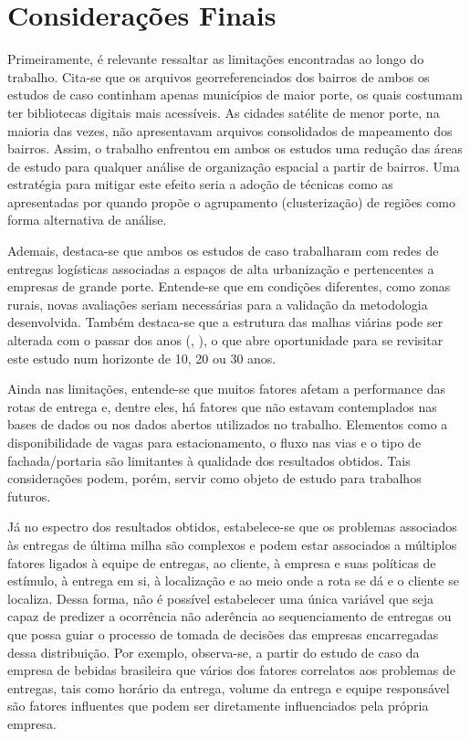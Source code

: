 \chapter{Considerações Finais} \label{sec:consideracoesFinais}

Primeiramente, é relevante ressaltar as limitações encontradas ao longo do trabalho.
Cita-se que os arquivos georreferenciados dos bairros de ambos os estudos de caso continham apenas municípios de maior porte, os quais costumam ter bibliotecas digitais mais acessíveis.
As cidades satélite de menor porte, na maioria das vezes, não apresentavam arquivos consolidados de mapeamento dos bairros.
Assim, o trabalho enfrentou em ambos os estudos uma redução das áreas de estudo para qualquer análise de organização espacial a partir de bairros.
Uma estratégia para mitigar este efeito seria a adoção de técnicas como as apresentadas por  quando propõe o agrupamento (clusterização) de regiões como forma alternativa de análise.

Ademais, destaca-se que ambos os estudos de caso trabalharam com redes de entregas logísticas associadas a espaços de alta urbanização e pertencentes a empresas de grande porte.
Entende-se que em condições diferentes, como zonas rurais, novas avaliações seriam necessárias para a validação da metodologia desenvolvida.
Também destaca-se que a estrutura das malhas viárias pode ser alterada com o passar dos anos (\citeauthoronline{}, \citeyear{}), o que abre oportunidade para se revisitar este estudo num horizonte de 10, 20 ou 30 anos. 

Ainda nas limitações, entende-se que muitos fatores afetam a performance das rotas de entrega e, dentre eles, há fatores que não estavam contemplados nas bases de dados ou nos dados abertos utilizados no trabalho.
Elementos como a disponibilidade de vagas para estacionamento, o fluxo nas vias e o tipo de fachada/portaria são limitantes à qualidade dos resultados obtidos.
Tais considerações podem, porém, servir como objeto de estudo para trabalhos futuros.

Já no espectro dos resultados obtidos, estabelece-se que os problemas associados às entregas de última milha são complexos e podem estar associados a múltiplos fatores ligados à equipe de entregas, ao cliente, à empresa e suas políticas de estímulo, à entrega em si, à localização e ao meio onde a rota se dá e o cliente se localiza.
Dessa forma, não é possível estabelecer uma única variável que seja capaz de predizer a ocorrência não aderência ao sequenciamento de entregas ou que possa guiar o processo de tomada de decisões das empresas encarregadas dessa distribuição.
Por exemplo, observa-se, a partir do estudo de caso da empresa de bebidas brasileira que vários dos fatores correlatos aos problemas de entregas, tais como horário da entrega, volume da entrega e equipe responsável são fatores influentes que podem ser diretamente influenciados pela própria empresa.

